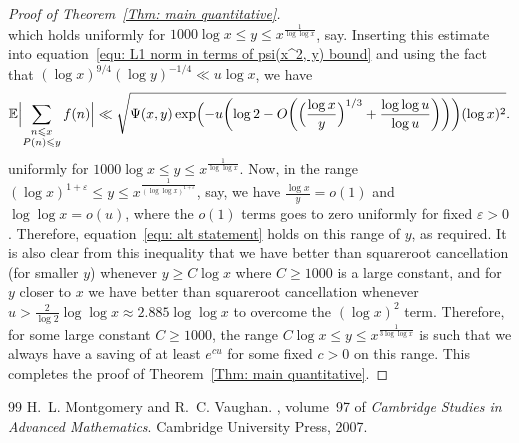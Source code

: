 \documentclass[10pt,a4paper]{amsart}
\def\E{\mathbb E}
\def\leq {\leqslant}
\begin{document}
\begin{proof}[Proof of Theorem~\ref{Thm: main quantitative}]
\[\]
which holds uniformly for $1000 \log x \leq y \leq x^{\frac{1}{\log \log x}}$, say. Inserting this estimate into equation~\eqref{equ: L1 norm in terms of psi(x^2, y) bound} and using the fact that $(\log x)^{9/4} (\log y)^{-1/4} \ll u \log x$, we have
\begin{equation}\label{equ: comp to trivial bound}
\E \Bigl| \sum_{\substack{n \leq x \\ P(n) \leq y}} f(n) \Bigr| \ll \\ 
\sqrt{\Psi(x,y)\exp \Bigl(-u \biggl( \log 2 -  O \biggl(\Bigl( \frac{\log x}{y} \Bigr)^{1/3} + \frac{\log \log u}{\log u} \biggr) \biggr) \biggr) (\log x)^2}.
\end{equation}
uniformly for $1000 \log x \leq y \leq x^{\frac{1}{\log \log x}}$. Now, in the range $(\log x)^{1 + \varepsilon} \leq y \leq x^{\frac{1}{(\log \log x)^{1 + \varepsilon}}}$, say, we have $\frac{\log x}{y} = o(1)$ and $\log \log x = o(u)$, where the $o(1)$ terms goes to zero uniformly for fixed $\varepsilon > 0$. Therefore, equation~\eqref{equ: alt statement} holds on this range of $y$, as required. It is also clear from this inequality that we have better than squareroot cancellation (for smaller $y$) whenever $y \geq C \log x$ where $C \geq 1000$ is a large constant, and for $y$ closer to $x$ we have better than squareroot cancellation whenever $u > \frac{2}{\log 2} \log \log x \approx 2.885 \log \log x$ to overcome the $(\log x)^{2}$ term. Therefore, for some large constant $C \geq 1000$, the range $C \log x \leq y \leq x^{\frac{1}{3\log \log x}}$ is such that we always have a saving of at least $e^{cu}$ for some fixed $c > 0$ on this range. This completes the proof of Theorem~\ref{Thm: main quantitative}.
\end{proof}

\begin{thebibliography}{99}
 H.~L. Montgomery and R.~C. Vaughan. , volume~97 of {\em Cambridge Studies in Advanced Mathematics}. \newblock Cambridge University Press, 2007.
\end{thebibliography}
\end{document}
